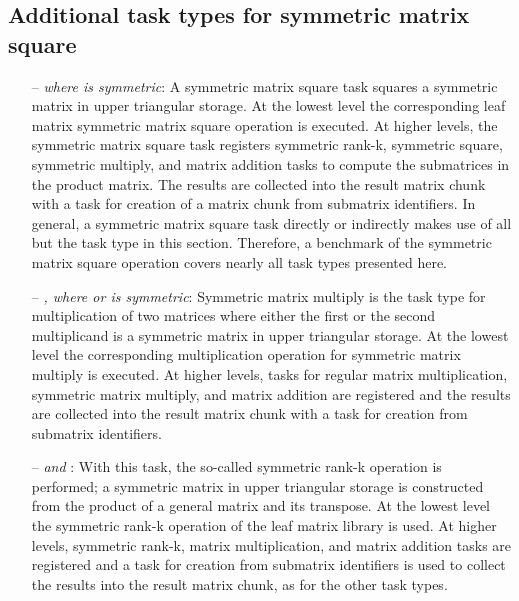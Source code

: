 \documentclass{elsarticle}
\begin{document}
\subsection{Additional task types for symmetric matrix square}\label{subsec:sysq-task-types}
\begin{itemize}
\item[--]\emph{ where  is symmetric}:
A symmetric matrix square task squares a symmetric matrix in upper
triangular storage. At the lowest level the corresponding leaf matrix
symmetric matrix square operation is executed. At higher levels, the
symmetric matrix square task registers symmetric rank-k, symmetric
square, symmetric multiply, and matrix addition tasks to compute the
submatrices in the product matrix.  The results are collected into the
result matrix chunk with a task for creation of a matrix chunk from
submatrix identifiers. In general, a symmetric matrix square task
directly or indirectly makes use of all but the  task type
in this section.
Therefore, a benchmark of the symmetric matrix square operation covers
nearly all task types presented here.


\item[--]\emph{, where  or  is symmetric}:
Symmetric matrix multiply is the task type for multiplication of two
matrices where either the first or the second multiplicand is a
symmetric matrix in upper triangular storage.  At the lowest level the
corresponding multiplication operation for symmetric matrix multiply
is executed. At higher levels, tasks for regular matrix
multiplication, symmetric matrix multiply, and matrix addition are
registered and the results are collected into the result matrix chunk
with a task for creation from submatrix identifiers.

\item[--]\emph{ and }:
With this task, the so-called symmetric rank-k operation is performed;
a symmetric matrix in upper triangular storage is constructed from the
product of a general matrix and its transpose.  At the lowest level
the symmetric rank-k operation of the leaf matrix library is used. At
higher levels, symmetric rank-k, matrix multiplication, and matrix
addition tasks are registered and
a task for creation from submatrix identifiers is used
to collect the results into the result matrix
chunk, as for the other task types.

\end{itemize}

 
\end{document}
